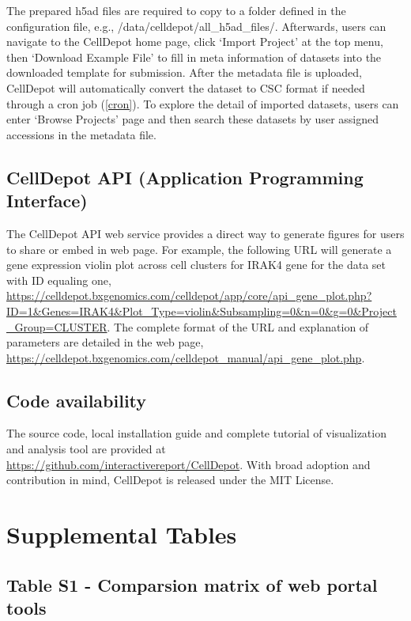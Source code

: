 \documentclass[
]{book}
\begin{document}
The prepared h5ad files are required to copy to a folder defined in the configuration file, e.g., /data/celldepot/all\_h5ad\_files/. Afterwards, users can navigate to the CellDepot home page, click `Import Project' at the top menu, then `Download Example File' to fill in meta information of datasets into the downloaded template for submission. After the metadata file is uploaded, CellDepot will automatically convert the dataset to CSC format if needed through a cron job (\ref{cron}). To explore the detail of imported datasets, users can enter `Browse Projects' page and then search these datasets by user assigned accessions in the metadata file.

\hypertarget{celldepot-api-application-programming-interface}{%
\section{CellDepot API (Application Programming Interface)}\label{celldepot-api-application-programming-interface}}

The CellDepot API web service provides a direct way to generate figures for users to share or embed in web page. For example, the following URL will generate a gene expression violin plot across cell clusters for IRAK4 gene for the data set with ID equaling one, \url{https://celldepot.bxgenomics.com/celldepot/app/core/api_gene_plot.php?ID=1\&Genes=IRAK4\&Plot_Type=violin\&Subsampling=0\&n=0\&g=0\&Project_Group=CLUSTER}. The complete format of the URL and explanation of parameters are detailed in the web page, \url{https://celldepot.bxgenomics.com/celldepot_manual/api_gene_plot.php}.

\hypertarget{code-availability}{%
\section{Code availability}\label{code-availability}}

The source code, local installation guide and complete tutorial of visualization and analysis tool are provided at \url{https://github.com/interactivereport/CellDepot}. With broad adoption and contribution in mind, CellDepot is released under the MIT License.

\hypertarget{SITable}{%
\chapter{Supplemental Tables}\label{SITable}}

\hypertarget{table-s1---comparsion-matrix-of-web-portal-tools}{%
\section*{Table S1 - Comparsion matrix of web portal tools}\label{table-s1---comparsion-matrix-of-web-portal-tools}}
\end{document}
